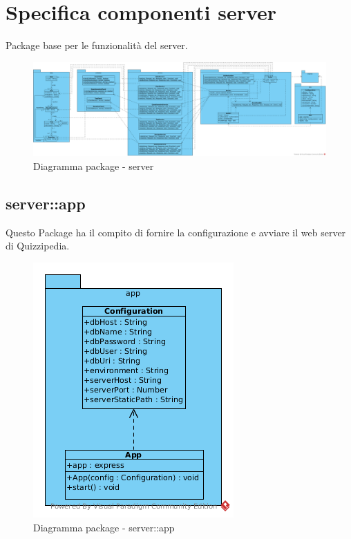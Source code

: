 \section{Specifica componenti server}
Package base per le funzionalità del server.\begin{center}
		\begin{figure}[H]
			\centering \includegraphics[scale=4, max width=\textwidth, max height=\myheight]{../img/diagrammiClassi/server.png}
			\caption{Diagramma package - server}
		\end{figure}
	\end{center}\subsection{server::app}
Questo Package ha il compito di fornire la configurazione e avviare il web server di Quizzipedia.\begin{center}
		\begin{figure}[H]
			\centering \includegraphics[scale=4, max width=\textwidth, max height=\myheight]{../img/diagrammiClassi/server/app.png}
			\caption{Diagramma package - server::app}
		\end{figure}
	\end{center}\hypertarget{server::app::App}{}
